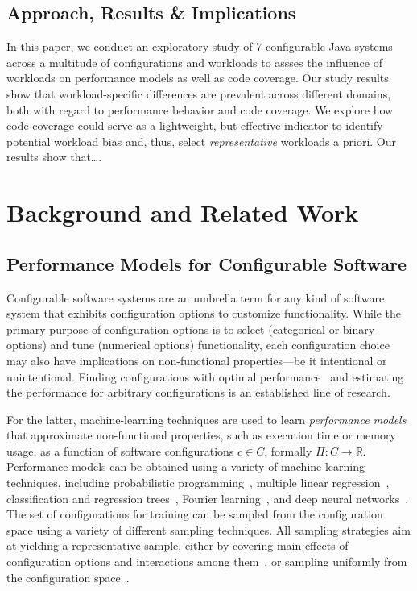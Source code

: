 \subsection*{Approach, Results \& Implications}
In this paper, we conduct an exploratory study of {\color{red}7} configurable Java systems across a multitude of configurations and workloads to assses the influence of workloads on performance models as well as code coverage. 
Our study results show that workload-specific differences are prevalent across different domains, both with regard to performance behavior and code coverage. We explore how code coverage could serve as a lightweight, but effective indicator to identify potential workload bias and, thus, select \emph{representative} workloads a priori. Our results show that\ldots.


\section{Background and Related Work}
\subsection{Performance Models for Configurable Software}
Configurable software systems are an umbrella term for any kind of software system that exhibits configuration options to customize functionality. 
While the primary purpose of configuration options is to select (categorical or binary options) and tune (numerical options) functionality, each configuration choice may also have implications on non-functional properties---be it intentional or unintentional. Finding configurations with optimal performance~\cite{nairUsingBadLearners2017,nairFlash18,ohFindingNearoptimalConfigurations2017} and estimating the performance for arbitrary configurations is an established line of research\cite{siegmundPerformanceinfluenceModelsHighly2015,haDeepPerf2019,perfAL,guoVariabilityawarePerformancePrediction2013,sarkarCostEfficientSamplingPerformance,guo_2018_data,fourier_learning_2015,perLasso}. 

For the latter, machine-learning techniques are used to learn \emph{performance models} that approximate non-functional properties, such as execution time or memory usage, as a function of software configurations $c \in C$, formally $\Pi: C \rightarrow \mathbb{R}$.
Performance models can be obtained using a variety of machine-learning techniques, including probabilistic programming~\cite{dorn2020}, multiple linear regression~\cite{siegmundPerformanceinfluenceModelsHighly2015}, classification and regression trees~\cite{sarkarCostEfficientSamplingPerformance,guo_2018_data}, Fourier learning~\cite{fourier_learning_2015,perLasso}, and deep neural networks~\cite{haDeepPerf2019,perfAL}.
The set of configurations for training can be sampled from the configuration space using a variety of different sampling techniques. All sampling strategies aim at yielding a representative sample, either by covering main effects of configuration options and interactions among them~\cite{siegmundPredictingPerformanceAutomated2012}, or sampling uniformly from the configuration space~\cite{ohFindingNearoptimalConfigurations2017,kaltenecker_distance-based_2019}.

